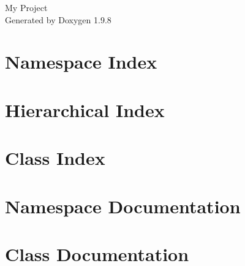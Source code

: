 \documentclass[twoside]{book}
\newcommand{\+}{\discretionary{\mbox{\scriptsize$\hookleftarrow$}}{}{}}
\newcommand{\clearemptydoublepage}{%
    \newpage{\pagestyle{empty}\cleardoublepage}%
  }
\begin{document}
  \raggedbottom
    \hypersetup{pageanchor=false,
                bookmarksnumbered=true,
                pdfencoding=unicode
               }
  \begin{titlepage}
  \vspace*{7cm}
  \begin{center}%
  {\Large My Project}\\
  \vspace*{1cm}
  {\large Generated by Doxygen 1.9.8}\\
  \end{center}
  \end{titlepage}
  \clearemptydoublepage
  \tableofcontents
  \clearemptydoublepage
  \hypersetup{pageanchor=true}
\chapter{Namespace Index}

\chapter{Hierarchical Index}

\chapter{Class Index}

\chapter{Namespace Documentation}





\chapter{Class Documentation}













  \backmatter
  \newpage
  \clearemptydoublepage
  \printindex
\end{document}
